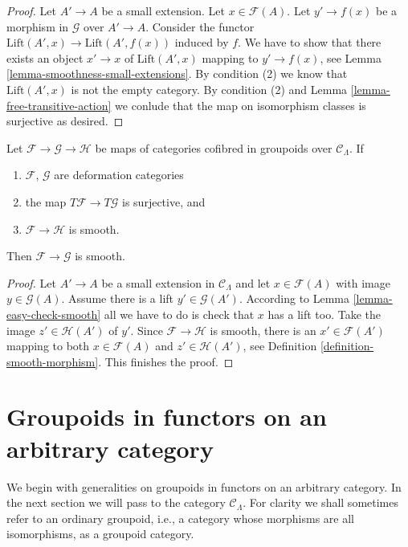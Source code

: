 \begin{proof}
Let $A' \to A$ be a small extension. Let $x \in \mathcal{F}(A)$.
Let $y' \to f(x)$ be a morphism in $\mathcal{G}$ over $A' \to A$.
Consider the functor $\text{Lift}(A', x) \to \text{Lift}(A', f(x))$
induced by $f$.
We have to show that there exists an object $x' \to x$
of $\text{Lift}(A', x)$ mapping to $y' \to f(x)$, see
Lemma \ref{lemma-smoothness-small-extensions}.
By condition (2) we know that $\text{Lift}(A', x)$
is not the empty category.
By condition (2) and
Lemma \ref{lemma-free-transitive-action}
we conlude that the map on isomorphism classes
is surjective as desired.
\end{proof}

\begin{lemma}
\label{lemma-map-between-smooth}
Let $\mathcal{F} \to \mathcal{G} \to \mathcal{H}$ be maps of categories
cofibred in groupoids over $\mathcal{C}_\Lambda$. If
\begin{enumerate}
\item $\mathcal{F}$, $\mathcal{G}$ are deformation categories
\item the map $T\mathcal{F} \to T\mathcal{G}$ is surjective, and
\item $\mathcal{F} \to \mathcal{H}$ is smooth.
\end{enumerate}
Then $\mathcal{F} \to \mathcal{G}$ is smooth.
\end{lemma}

\begin{proof}
Let $A' \to A$ be a small extension in $\mathcal{C}_\Lambda$
and let $x \in \mathcal{F}(A)$ with image $y \in \mathcal{G}(A)$.
Assume there is a lift $y' \in \mathcal{G}(A')$. According to
Lemma \ref{lemma-easy-check-smooth} all we have to do is check
that $x$ has a lift too. Take the image $z' \in \mathcal{H}(A')$
of $y'$. Since $\mathcal{F} \to \mathcal{H}$ is smooth, there is
an $x' \in \mathcal{F}(A')$ mapping to both $x \in \mathcal{F}(A)$
and $z' \in \mathcal{H}(A')$, see
Definition \ref{definition-smooth-morphism}. This finishes the proof.
\end{proof}





\section{Groupoids in functors on an arbitrary category}
\label{section-groupoids-arbitrary}

\noindent
We begin with generalities on groupoids in functors on an
arbitrary category. In the next section we will
pass to the category $\mathcal{C}_\Lambda$.
For clarity we shall sometimes refer to an ordinary groupoid,
i.e., a category whose morphisms are all isomorphisms, as a groupoid category.

